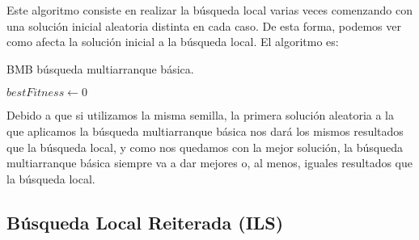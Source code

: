 \documentclass[11pt,a4paper]{article}
\begin{document}
Este algoritmo consiste en realizar la búsqueda local varias veces comenzando con una solución inicial aleatoria distinta en cada caso. De esta forma, podemos ver como afecta la solución inicial a la búsqueda local. El algoritmo es: \\
\begin{algorithm}[H]
	\caption{{\sc BMB} búsqueda multiarranque básica.}
	
	$bestFitness \gets 0$ \;
	
	 \;
\end{algorithm}

Debido a que si utilizamos la misma semilla, la primera solución aleatoria a la que aplicamos la búsqueda multiarranque básica nos dará los mismos resultados que la búsqueda local, y como nos quedamos con la mejor solución, la búsqueda multiarranque básica siempre va a dar mejores o, al menos, iguales resultados que la búsqueda local.

\subsection{Búsqueda Local Reiterada (ILS)}
\end{document}
